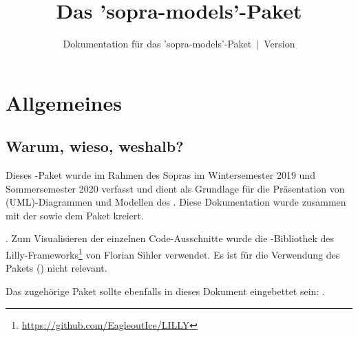 \documentclass{sopra-base}
\title{Das 'sopra-models'-Paket}
\subtitle[Dokumentation für das 'sopra-models'-Paket]{Dokumentation für das 'sopra-models'-Paket~$\mid$~Version \thesomversion}
\begin{document}
    \maketitle%
%
%

%
%
%
%

\section{Allgemeines}
\subsection{Warum, wieso, weshalb?}
    Dieses \LaTeXe-Paket wurde im Rahmen des Sopras im 
    Wintersemester 2019 und Sommersemester 2020 verfasst und dient als
    Grundlage für die Präsentation von (UML)-Diagrammen und Modellen
    des . Diese Dokumentation wurde zusammen mit der 
     sowie dem Paket  kreiert.\par
    .\newline
    Zum Visualisieren der einzelnen Code-Ausschnitte wurde die 
    -Bibliothek des Lilly-Frameworks\footnote{\url{https://github.com/EagleoutIce/LILLY}} von
    Florian Sihler verwendet. Es ist für die Verwendung des Pakets ()
    nicht relevant.\par
    Das zugehörige Paket sollte ebenfalls in dieses Dokument eingebettet sein: .
\end{document}

